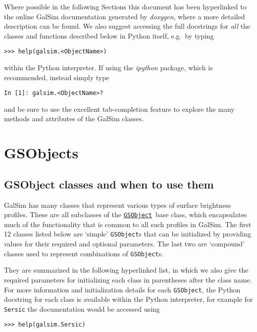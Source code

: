 \documentclass[preprint,10pt]{../../devel/modules/aastex}
\newcommand\GSObject{\href{http://galsim-developers.github.io/GalSim/classgalsim_1_1base_1_1_g_s_object.html}{\texttt{GSObject}}}
\begin{document}
Where possible in the following Sections this document has been hyperlinked to the online
GalSim documentation generated by \emph{doxygen}, where a more detailed
description can be found.  We also suggest accessing the full docstrings for \emph{all} the
classes and functions described below in Python itself, e.g.\ by typing

\texttt{>>> help(galsim.<ObjectName>)}

within the Python interpreter.  If using the \emph{ipython} package,
which is recommended, instead simply type

\texttt{In [1]: galsim.<ObjectName>?}

and be sure to use the excellent tab-completion feature to explore the many
methods and attributes of the GalSim classes.


\section{GSObjects}\label{sect:gsobjects}

\subsection{GSObject classes and when to use them}\label{sect:gsobjectclasses}
GalSim has many classes that represent various types of surface brightness profiles.
These are all subclasses of the \GSObject\ base class, which encapsulates
much of the functionality that is common to all such profiles in GalSim.
The first 12 classes listed below are
`simple' \texttt{GSObject}s that can be initialized by providing
values for their required and optional parameters.  The last two are
`compound' classes used to represent combinations of
\texttt{GSObject}s.

They are summarized in the following hyperlinked list, in which we also give
the required parameters for initializing each class in parentheses
after the class name.  For more information and initialization details for each \texttt{GSObject},
the Python docstring for each class is available within the Python interpreter, for example for
\texttt{Sersic} the documentation would be accessed using

\texttt{>>> help(galsim.Sersic)}
\end{document}
